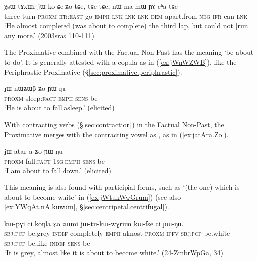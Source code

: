 \begin{exe}
\ex \label{ex:XsWtAxWr.jikoCe}
\gll  χsɯ-tɤxɯr jɯ-ko-ɕe ʑo tɕe,  tɕe tɕe, nɯ ma mɯ-ɲɤ-cʰa tɕe \\
three-turn \textsc{proxm}-\textsc{ifr}:\textsc{east}-go \textsc{emph} \textsc{lnk} \textsc{lnk} \textsc{lnk} \textsc{dem} apart.from \textsc{neg}-\textsc{ifr}-can \textsc{lnk} \\
\glt `He almost completed (was about to complete) the third lap, but could not [run] any more.' (2003sras 110-111)
\end{exe}

The Proximative combined with the Factual Non-Past has the meaning `be about to do'. It is generally attested with a copula as in (\ref{ex:jWnWZWB}), like the Periphrastic Proximative (§\ref{sec:proximative.periphrastic}). 

\begin{exe}
\ex \label{ex:jWnWZWB}
\gll jɯ-nɯʑɯβ ʑo ɲɯ-ŋu \\
\textsc{proxm}-sleep:\textsc{fact} \textsc{emph} \textsc{sens}-be \\
\glt `He is about to fall asleep.' (elicited)
\end{exe}

With contracting verbs (§\ref{sec:contraction}) in the Factual Non-Past, the Proximative merges with the contracting vowel as , as in (\ref{ex:jatAra.Zo}).

\begin{exe}
\ex \label{ex:jatAra.Zo}
\gll jɯ-atar-a ʑo ɲɯ-ŋu \\
\textsc{proxm}-fall:\textsc{fact}-\textsc{1sg} \textsc{emph} \textsc{sens}-be \\
\glt `I am about to fall down.' (elicited)
\end{exe}


This meaning is also found with participial forms, such as  `(the one) which is about to become white' in (\ref{ex:jWtukWwGrum}) (see also \ref {ex:YWqAt.nA.kuwum}, §\ref{sec:centripetal.centrifugal}).
 
 \begin{exe} 
\ex \label{ex:jWtukWwGrum}
\gll  kɯ-pɣi ci koŋla ʑo zɯmi jɯ-tu-kɯ-wɣrum kɯ-fse ci ɲɯ-ŋu.  \\
\textsc{sbj}:\textsc{pcp}-be.grey \textsc{indef} completely \textsc{emph} almost \textsc{proxm}-\textsc{ipfv}-\textsc{sbj}:\textsc{pcp}-be.white \textsc{sbj}:\textsc{pcp}-be.like \textsc{indef} \textsc{sens}-be \\
\glt `It is grey, almost like it is about to become white.'  (24-ZmbrWpGa, 34)
\end{exe}

